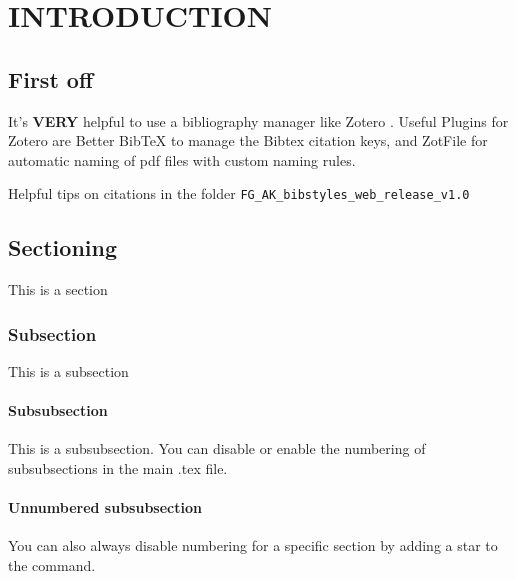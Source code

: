 \chapter{INTRODUCTION}
\label{ch:introduction}

\section*{First off}
It's \textbf{VERY} helpful to use a bibliography manager like Zotero \cite{Zotero}. Useful Plugins for Zotero are Better BibTeX \cite{BetterBibtex} to manage the Bibtex citation keys, and ZotFile \cite{ZotFile} for automatic naming of pdf files with custom naming rules. 

Helpful tips on citations in the folder \texttt{FG\_AK\_bibstyles\_web\_release\_v1.0}

\section{Sectioning}
This is a section

\subsection{Subsection}
This is a subsection

\subsubsection{Subsubsection}
This is a subsubsection. You can disable or enable the numbering of subsubsections in the main .tex file.

\subsubsection*{Unnumbered subsubsection}
You can also always disable numbering for a specific section by adding a star to the command.

